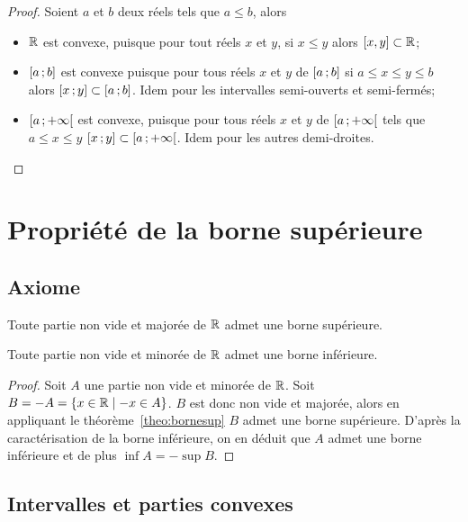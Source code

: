 \begin{proof}
  Soient $a$ et $b$ deux réels tels que $a\leq b$, alors
  \begin{itemize}
  \item $\mathbb{R}$ est convexe, puisque pour tout réels $x$ et $y$, si $x\leq y$ alors $[x,y]\subset \mathbb{R}$;
  \item $\left[ a \, ;  b \right]$ est convexe puisque pour tous réels $x$ et $y$ de $\left[ a \, ;  b \right]$ si $a\leq x\leq y\leq b$ alors $\left[ x \, ;  y \right]\subset \left[ a \, ;  b \right]$. Idem pour les intervalles semi-ouverts et semi-fermés;
  \item $\left[ a \, ;  +\infty \right[$ est convexe, puisque pour tous réels $x$ et $y$ de $\left[ a \, ;  +\infty \right[$ tels que $a\leq x\leq y$ $\left[ x \, ;  y \right]\subset \left[ a \, ;  +\infty \right[$. Idem pour les autres demi-droites.
  \end{itemize}
\end{proof}

\section{Propriété de la borne supérieure}

\subsection{Axiome}

\begin{theo}
  \label{theo:bornesup}
  Toute partie non vide et majorée de $\mathbb{R}$ admet une borne supérieure.
\end{theo}
\begin{theo}
  Toute partie non vide et minorée de $\mathbb{R}$ admet une borne inférieure.
\end{theo}
\begin{proof}
  Soit $A$ une partie non vide et minorée de $\mathbb{R}$. Soit $B=-A=\left\{x\in \mathbb{R}\mathrel{}\middle|\mathrel{}-x \in A\right\}$. $B$ est donc non vide et majorée, alors en appliquant le théorème~\ref{theo:bornesup} $B$ admet une borne supérieure. D'après la caractérisation de la borne inférieure, on en déduit que $A$ admet une borne inférieure et de plus $\inf A=-\sup B$.
\end{proof}

\subsection{Intervalles et parties convexes}

